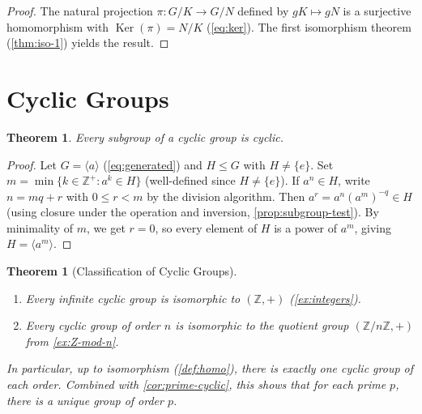 \documentclass[12pt,a4paper]{article}
\theoremstyle{definition}
\theoremstyle{plain}
\newtheorem{theorem}[definition]{Theorem}
\theoremstyle{remark}
\newcommand{\Z}{\mathbb{Z}}
\newcommand{\Ker}{\operatorname{Ker}}
\begin{document}
\begin{proof}
The natural projection $\pi \colon G/K \to G/N$ defined by $gK \mapsto gN$ is a
surjective homomorphism with $\Ker(\pi) = N/K$ (\cref{eq:ker}).
The first isomorphism theorem (\cref{thm:iso-1}) yields the result.
\end{proof}


\section{Cyclic Groups}\label{sec:cyclic}

\begin{theorem}\label{thm:cyclic-subgroup}
Every subgroup of a cyclic group is cyclic.
\end{theorem}

\begin{proof}
Let $G = \langle a \rangle$ (\cref{eq:generated}) and $H \leq G$ with $H \neq \{e\}$.
Set $m = \min\{k \in \Z^+ : a^k \in H\}$ (well-defined since $H \neq \{e\}$).
If $a^n \in H$, write $n = mq + r$ with $0 \leq r < m$ by the division algorithm.
Then $a^r = a^n(a^m)^{-q} \in H$ (using closure under the operation and inversion,
\cref{prop:subgroup-test}).
By minimality of $m$, we get $r = 0$, so every element of $H$ is a power of $a^m$,
giving $H = \langle a^m \rangle$.
\end{proof}

\begin{theorem}[Classification of Cyclic Groups]\label{thm:cyclic-classification}
\begin{enumerate}
    \item Every infinite cyclic group is isomorphic
          to $(\Z, +)$ (\cref{ex:integers}).
    \item Every cyclic group of order $n$ is isomorphic to the quotient group
          $(\Z/n\Z, +)$ from \cref{ex:Z-mod-n}.
\end{enumerate}
In particular, up to isomorphism (\cref{def:homo}), there is exactly one cyclic group
of each order. Combined with \cref{cor:prime-cyclic}, this shows that for each
prime $p$, there is a unique group of order $p$.
\end{theorem}
\end{document}
